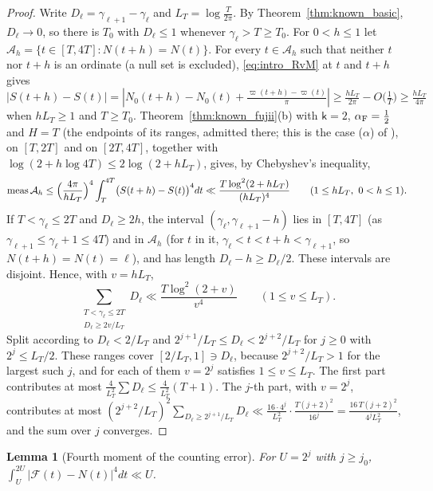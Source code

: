 \documentclass[11pt,a4paper]{article}
\makeatletter
\numberwithin{equation}{section}
\DeclareRobustCommand{\CGref}[1]{\ref{#1}}
\DeclareRobustCommand{\CGeqref}[1]{\eqref{#1}}
\DeclareRobustCommand{\CGcite}[2][]{\if\relax\detokenize{#1}\relax\cite{#2}\else\cite[#1]{#2}\fi}
\let\CG@origref\ref
\let\CG@origeqref\eqref
\newcommand{\CG@gettip}[1]{\@ifundefined{CGTip@#1}{#1}{\csname CGTip@#1\endcsname}}
\newcommand{\CG@getbib}[1]{\@ifundefined{CGBib@#1}{#1}{\csname CGBib@#1\endcsname}}
\DeclareRobustCommand{\CGref}[1]{\pdftooltip{\CG@origref{#1}}{\CG@gettip{#1}}}
\DeclareRobustCommand{\CGeqref}[1]{\pdftooltip{\CG@origeqref{#1}}{\CG@gettip{#1}}}
\DeclareRobustCommand{\CGcite}[2][]{\pdftooltip{\if\relax\detokenize{#1}\relax\cite{#2}\else\cite[#1]{#2}\fi}{\CG@getbib{#2}}}
\newtheorem{lemma}[theorem]{Lemma}
\theoremstyle{definition}
\theoremstyle{remark}
\newcommand{\Nz}{N_0} %
\newcommand{\Fc}{\mathcal F}
\newcommand{\meas}{\operatorname{meas}}
\makeatother
\begin{document}
\begin{proof}
Write $D_\ell=\gamma_{\ell+1}-\gamma_\ell$ and $L_T=\log\frac T{2\pi}$. By Theorem~\CGref{thm:known_basic}, $D_\ell\to0$, so there is $T_0$ with $D_\ell\le1$ whenever $\gamma_\ell>T\ge T_0$. For $0<h\le1$ let $\mathcal A_h=\{t\in[T,4T]:N(t+h)=N(t)\}$. For every $t\in\mathcal A_h$ such that neither $t$ nor $t+h$ is an ordinate (a null set is excluded), \CGeqref{eq:intro_RvM} at $t$ and $t+h$ gives $|S(t+h)-S(t)|=|\Nz(t+h)-\Nz(t)+\frac{\varpi(t+h)-\varpi(t)}\pi|\ge\frac{hL_T}{2\pi}-O\bigl(\frac1T\bigr)\ge\frac{hL_T}{4\pi}$ when $hL_T\ge1$ and $T\ge T_0$. Theorem~\CGref{thm:known_fujii}(b) with $\mathsf k=2$, $\alpha_{\rm F}=\frac12$ and $H=T$ (the endpoints of its ranges, admitted there; this is the case ($\alpha$) of \CGcite{Fujii1981}), on $[T,2T]$ and on $[2T,4T]$, together with $\log(2+h\log4T)\le2\log(2+hL_T)$, gives, by Chebyshev's inequality,
\[
\meas\mathcal A_h\le\Bigl(\frac{4\pi}{hL_T}\Bigr)^4\int_T^{4T}\bigl(S(t+h)-S(t)\bigr)^4dt\ll\frac{T\log^2(2+hL_T)}{(hL_T)^4}\qquad(1\le hL_T,\ 0<h\le1).
\]
If $T<\gamma_\ell\le2T$ and $D_\ell\ge2h$, the interval $(\gamma_\ell,\gamma_{\ell+1}-h)$ lies in $[T,4T]$ (as $\gamma_{\ell+1}\le\gamma_\ell+1\le4T$) and in $\mathcal A_h$ (for $t$ in it, $\gamma_\ell<t<t+h<\gamma_{\ell+1}$, so $N(t+h)=N(t)=\ell$), and has length $D_\ell-h\ge D_\ell/2$. These intervals are disjoint. Hence, with $v=hL_T$,
\[
\sum_{\substack{T<\gamma_\ell\le2T\\ D_\ell\ge2v/L_T}}D_\ell\ll\frac{T\log^2(2+v)}{v^4}\qquad(1\le v\le L_T).
\]
Split according to $D_\ell<2/L_T$ and $2^{j+1}/L_T\le D_\ell<2^{j+2}/L_T$ for $j\ge0$ with $2^j\le L_T/2$. These ranges cover $[2/L_T,1]\ni D_\ell$, because $2^{j+2}/L_T>1$ for the largest such $j$, and for each of them $v=2^j$ satisfies $1\le v\le L_T$. The first part contributes at most $\frac4{L_T^2}\sum D_\ell\le\frac4{L_T^2}(T+1)$. The $j$-th part, with $v=2^j$, contributes at most $(2^{j+2}/L_T)^2\sum_{D_\ell\ge2^{j+1}/L_T}D_\ell\ll\frac{16\cdot4^j}{L_T^2}\cdot\frac{T(j+2)^2}{16^j}=\frac{16\,T(j+2)^2}{4^jL_T^2}$, and the sum over $j$ converges.
\end{proof}

\begin{lemma}[Fourth moment of the counting error]\label{lem:fourth}
For $U=2^j$ with $j\ge j_0$, $\int_U^{2U}|\Fc(t)-N(t)|^4dt\ll U$.
\end{lemma}
\end{document}
